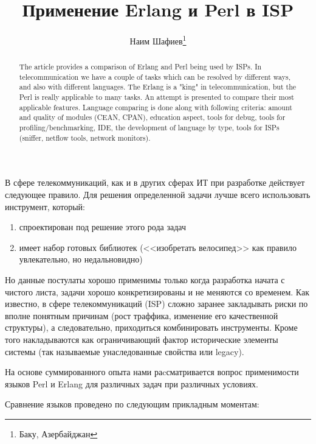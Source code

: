 \documentclass[10pt, a5paper]{article}
\begin{document}
\title{Применение Erlang и Perl в ISP}%

\author{Наим Шафиев\footnote{Баку, Азербайджан}}
\maketitle

\begin{abstract}
The article provides a comparison of Erlang and Perl being used by ISPs.
In telecommunication we have a couple of tasks which can be resolved by different ways, and also with different languages. The Erlang is a "king" in telecommunication, but the Perl is really applicable to many tasks. An attempt is presented to compare their most applicable features. Language comparing is done along with following criteria: amount and quality of modules (CEAN, CPAN), education aspect, tools for debug, tools for profiling/benchmarking, IDE, the development of language by type, tools for ISPs (sniffer, netflow tools, network monitors).
\end{abstract}


В сфере телекоммуникаций, как и в других сферах ИТ при разработке действует следующее правило. Для решения определенной задачи лучше всего использовать инструмент, который:

\begin{enumerate}
  \item спроектирован под решение этого рода задач
  \item имеет набор готовых библиотек (<<изобретать велосипед>> как правило увлекательно, но  недальновидно)
\end{enumerate}

Но данные постулаты хорошо применимы только когда разработка начата с чистого листа, задачи хорошо конкретизированы и не меняются со временем.
Как известно, в сфере телекоммуникаций (ISP) сложно заранее закладывать риски по вполне понятным причинам (рост траффика, изменение его качественной структуры), а следовательно, приходиться комбинировать инструменты. Кроме того накладываются как ограничивающий фактор исторические элементы системы (так называемые унаследованные свойства или legacy).

На основе суммированного опыта нами раcсматривается вопрос применимости языков Perl и Erlang для различных задач при различных условиях.

Сравнение языков проведено по следующим прикладным моментам:
\end{document}
